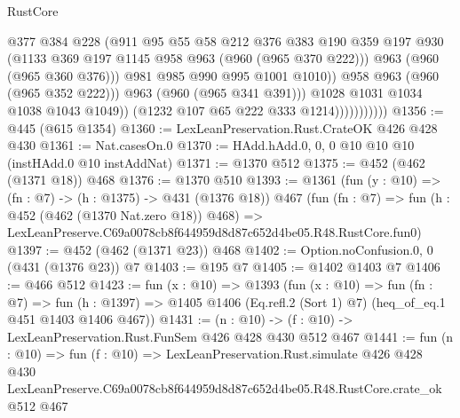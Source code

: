 \begin{lexlean}{RustCore}
\begin{coremodule}
                                    @377
                                    @384
                                    @228
                                    (@911
                                      @95
                                      @55
                                      @58
                                      @212
                                      @376
                                      @383
                                      @190
                                      @359
                                      @197
                                      @930
                                      (@1133 @369 @197 @1145 @958 @963 (@960 (@965 @370 @222)))
                                      @963
                                      (@960 (@965 @360 @376)))
                                    @981
                                    @985
                                    @990
                                    @995
                                    @1001
                                    @1010))
                                @958
                                @963
                                (@960 (@965 @352 @222)))
                              @963
                              (@960 (@965 @341 @391)))
                            @1028
                            @1031
                            @1034
                            @1038
                            @1043
                            @1049))
                        (@1232 @107 @65 @222 @333 @1214)))))))))))
@1356 := @445 (@615 @1354)
@1360 := LexLeanPreservation.Rust.CrateOK @426 @428 @430
@1361 := Nat.casesOn.{0}
@1370 := HAdd.hAdd.{0, 0, 0} @10 @10 @10 (instHAdd.{0} @10 instAddNat)
@1371 := @1370 @512
@1375 := @452 (@462 (@1371 @18)) @468
@1376 := @1370 @510
@1393 := @1361
    (fun (y : @10) => (fn : @7) -> (h : @1375) -> @431 (@1376 @18))
    @467
    (fun (fn : @7) =>
    fun (h : @452 (@462 (@1370 Nat.zero @18)) @468) =>
    LexLeanPreserve.C69a0078cb8f644959d8d87c652d4be05.R48.RustCore.fun0)
@1397 := @452 (@462 (@1371 @23)) @468
@1402 := Option.noConfusion.{0, 0} (@431 (@1376 @23)) @7
@1403 := @195 @7
@1405 := @1402 @1403 @7
@1406 := @466 @512
@1423 := fun (x : @10) =>
  @1393
    (fun (x : @10) =>
    fun (fn : @7) =>
    fun (h : @1397) => @1405 @1406 (Eq.refl.{2} (Sort 1) @7) (heq_of_eq.{1} @451 @1403 @1406 @467))
@1431 := (n : @10) -> (f : @10) -> LexLeanPreservation.Rust.FunSem @426 @428 @430 @512 @467
@1441 := fun (n : @10) =>
  fun (f : @10) =>
  LexLeanPreservation.Rust.simulate
    @426
    @428
    @430
    LexLeanPreserve.C69a0078cb8f644959d8d87c652d4be05.R48.RustCore.crate_ok
    @512
    @467
\end{coremodule}
\end{lexlean}
